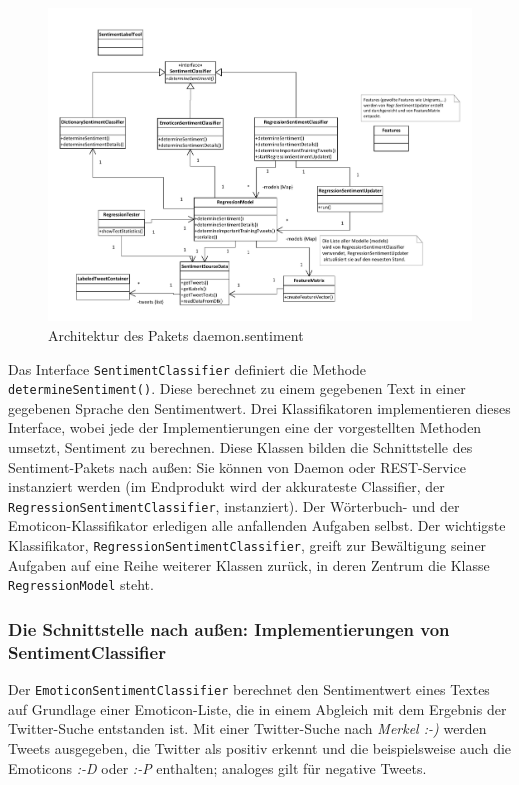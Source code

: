 \begin{figure}
 \centering


  \centering
    \includegraphics[width=\textwidth]{./Bilder/Sentiment/SentimentPackageClassDiagramm.pdf}
  \caption{Architektur des Pakets daemon.sentiment}
  \label{sentimentuml}
\end{figure}

Das Interface \texttt{Sentiment\-Classifier} definiert die Methode \texttt{determine\-Sentiment()}. Diese berechnet zu einem gegebenen Text in einer gegebenen Sprache den Sentimentwert. Drei Klassifikatoren implementieren dieses Interface, wobei jede der Implementierungen eine der vorgestellten Methoden umsetzt, Sentiment zu berechnen. Diese Klassen bilden die Schnittstelle des Sentiment-Pakets nach außen: Sie können von Daemon oder REST-Service instanziert werden (im Endprodukt wird der akkurateste Classifier, der \texttt{Regression\-Sentiment\-Classifier}, instanziert). Der Wörterbuch- und der Emoticon-Klassifikator erledigen alle anfallenden Aufgaben selbst. Der wichtigste Klassifikator, \texttt{Re\-gre\-ssion\-Sentiment\-Classifier}, greift zur Bewältigung seiner Aufgaben auf eine Reihe weiterer Klassen zurück, in deren Zentrum die Klasse \texttt{Regression\-Model} steht.

\subsubsection{Die Schnittstelle nach außen: Implementierungen von SentimentClassifier}
\label{sec:sentimentclassifier}

Der \texttt{Emoticon\-Sentiment\-Classifier} berechnet den Sentimentwert eines Textes auf Grundlage einer Emoticon-Liste, die in einem Abgleich mit dem Ergebnis der Twitter-Suche entstanden ist. Mit einer Twitter-Suche nach \textit{Merkel :-)} werden Tweets ausgegeben, die Twitter als positiv erkennt und die beispielsweise auch die Emoticons \textit{:-D} oder \textit{:-P} enthalten; analoges gilt für negative Tweets.

